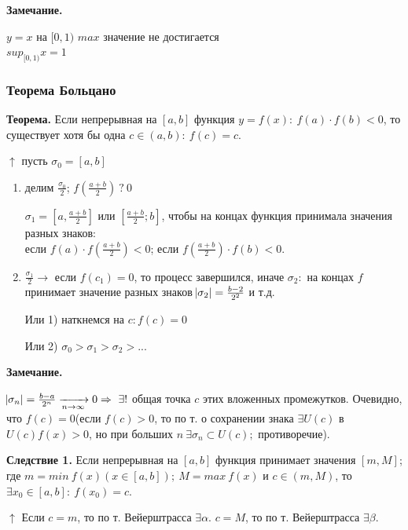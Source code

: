 \documentclass{article}
\begin{document}
    \textbf{Замечание.} 

    \( y = x \) на \( [0, 1) \) \( max \) значение не достигается\\
    \( sup_{[0, 1)} x = 1 \)


    \subsubsection{Теорема Больцано}
    \textbf{Теорема.} Если непрерывная на \([a, b]\) функция \(y = f(x):\ f(a) \cdot f(b) < 0\), то существует хотя бы одна \(c \in (a, b):\ f(c) = c\).

    \( \uparrow \) пусть \( \sigma_0 = [a, b] \)

    \begin{enumerate}
        \item делим \( \frac{\sigma_0}{2} \); \( f(\frac{a + b}{2})\ ?\ 0 \)
        
        \( \sigma_1 = [a, \frac{a + b}{2}] \) или \( [\frac{a + b}{2}; b] \), чтобы на концах функция принимала значения разных знаков:\\
        если \(f(a) \cdot f(\frac{a+b}{2}) < 0\); если \(f(\frac{a+b}{2}) \cdot f(b) < 0\).
        
        \item \( \frac{\sigma_1}{2} \rightarrow \) если \(f(c_1) = 0\), то процесс завершился, иначе \(\sigma_2:\) на концах \(f\) принимает значение разных знаков \( \abs{\sigma_2} = \frac{b - 2}{2^2} \) и т.д. 
        
        Или 1) наткнемся на \( c: f(c) = 0 \)
        
        Или 2) \( \sigma_0 > \sigma_1 > \sigma_2 > ... \)
    \end{enumerate}
    
    \textbf{Замечание.}

    \(\abs{\sigma_n} = \frac{b-a}{2^n} \xrightarrow[n \rightarrow \infty]{} 0 \Rightarrow\ \exists !\) общая точка \(c\) этих вложенных промежутков. Очевидно, что \(f(c) = 0\)(если \(f(c) > 0\), то по т. о сохранении знака \(\exists U(c)\) в \(U(c) f(x) > 0\), но при больших \(n\ \exists \sigma_n \subset U(c);\) противоречие).

    \textbf{Следствие 1.} Если непрерывная на \([a, b]\) функция принимает значения \([m, M]\); где \(m = min\ f(x)(x \in [a, b]);\ M = max\ f(x)\) и \(c \in (m, M)\), то \(\exists x_0 \in [a,b]:\ f(x_0) = c\).
    
    \( \uparrow \) Если \( c = m \), то по т. Вейерштрасса \( \exists \alpha \). \( c = M \), то по т. Вейерштрасса \( \exists \beta \).
\end{document}
